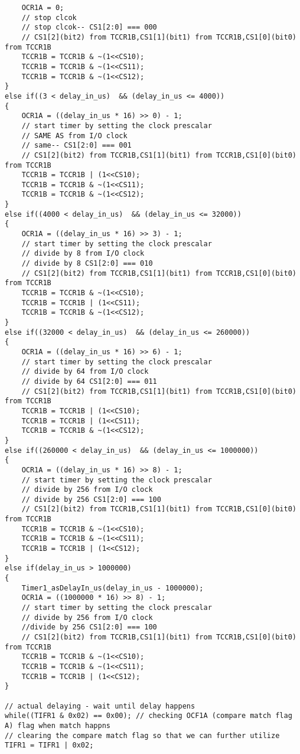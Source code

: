 \documentclass{article}
\begin{document}
\begin{verbatim}
    OCR1A = 0;
    // stop clcok
    // stop clcok-- CS1[2:0] === 000
    // CS1[2](bit2) from TCCR1B,CS1[1](bit1) from TCCR1B,CS1[0](bit0) from TCCR1B
    TCCR1B = TCCR1B & ~(1<<CS10);
    TCCR1B = TCCR1B & ~(1<<CS11);
    TCCR1B = TCCR1B & ~(1<<CS12);
}
else if((3 < delay_in_us)  && (delay_in_us <= 4000))
{
    OCR1A = ((delay_in_us * 16) >> 0) - 1;
    // start timer by setting the clock prescalar
    // SAME AS from I/O clock
    // same-- CS1[2:0] === 001
    // CS1[2](bit2) from TCCR1B,CS1[1](bit1) from TCCR1B,CS1[0](bit0) from TCCR1B
    TCCR1B = TCCR1B | (1<<CS10);
    TCCR1B = TCCR1B & ~(1<<CS11);
    TCCR1B = TCCR1B & ~(1<<CS12);
}
else if((4000 < delay_in_us)  && (delay_in_us <= 32000))
{
    OCR1A = ((delay_in_us * 16) >> 3) - 1;
    // start timer by setting the clock prescalar
    // divide by 8 from I/O clock
    // divide by 8 CS1[2:0] === 010
    // CS1[2](bit2) from TCCR1B,CS1[1](bit1) from TCCR1B,CS1[0](bit0) from TCCR1B
    TCCR1B = TCCR1B & ~(1<<CS10);
    TCCR1B = TCCR1B | (1<<CS11);
    TCCR1B = TCCR1B & ~(1<<CS12);
}
else if((32000 < delay_in_us)  && (delay_in_us <= 260000))
{
    OCR1A = ((delay_in_us * 16) >> 6) - 1;
    // start timer by setting the clock prescalar
    // divide by 64 from I/O clock
    // divide by 64 CS1[2:0] === 011
    // CS1[2](bit2) from TCCR1B,CS1[1](bit1) from TCCR1B,CS1[0](bit0) from TCCR1B
    TCCR1B = TCCR1B | (1<<CS10);
    TCCR1B = TCCR1B | (1<<CS11);
    TCCR1B = TCCR1B & ~(1<<CS12);
}
else if((260000 < delay_in_us)  && (delay_in_us <= 1000000))
{
    OCR1A = ((delay_in_us * 16) >> 8) - 1;
    // start timer by setting the clock prescalar
    // divide by 256 from I/O clock
    // divide by 256 CS1[2:0] === 100
    // CS1[2](bit2) from TCCR1B,CS1[1](bit1) from TCCR1B,CS1[0](bit0) from TCCR1B
    TCCR1B = TCCR1B & ~(1<<CS10);
    TCCR1B = TCCR1B & ~(1<<CS11);
    TCCR1B = TCCR1B | (1<<CS12);
}
else if(delay_in_us > 1000000)
{
    Timer1_asDelayIn_us(delay_in_us - 1000000);
    OCR1A = ((1000000 * 16) >> 8) - 1;
    // start timer by setting the clock prescalar
    // divide by 256 from I/O clock
    //divide by 256 CS1[2:0] === 100
    // CS1[2](bit2) from TCCR1B,CS1[1](bit1) from TCCR1B,CS1[0](bit0) from TCCR1B
    TCCR1B = TCCR1B & ~(1<<CS10);
    TCCR1B = TCCR1B & ~(1<<CS11);
    TCCR1B = TCCR1B | (1<<CS12);
}

// actual delaying - wait until delay happens
while((TIFR1 & 0x02) == 0x00); // checking OCF1A (compare match flag A) flag when match happns
// clearing the compare match flag so that we can further utilize
TIFR1 = TIFR1 | 0x02;
\end{verbatim}
\end{document}
